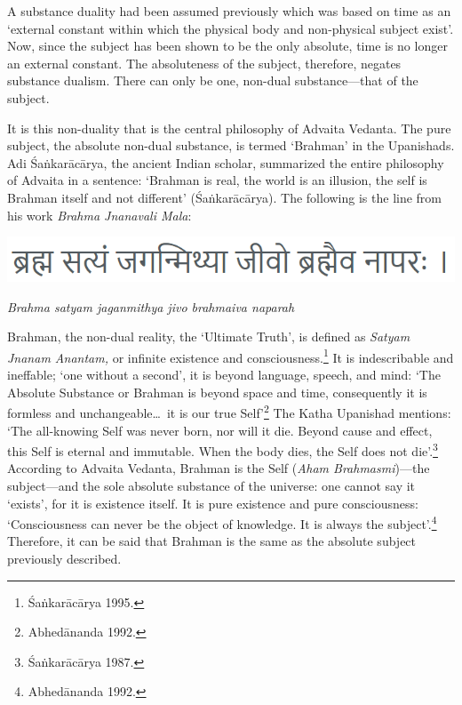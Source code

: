 A substance duality had been assumed previously which was based on time
as an `external constant within which the physical body and non-physical
subject exist'. Now, since the subject has been shown to be the only
absolute, time is no longer an external constant. The absoluteness of
the subject, therefore, negates substance dualism. There can only be
one, non-dual substance---that of the subject.

It is this non-duality that is the central philosophy of Advaita
Vedanta. The pure subject, the absolute non-dual substance, is termed
`Brahman' in the Upanishads. Adi \'Sa\.nkar\=ac\=arya, the ancient Indian
scholar, summarized the entire philosophy of Advaita in a sentence:
`Brahman is real, the world is an illusion, the self is Brahman itself
and not different' (\'Sa\.nkar\=ac\=arya). The following is the line from his
work \emph{Brahma Jnanavali Mala}:
\begin{center}
\includegraphics[scale = 0.525]{nathBrahma}

\emph{Brahma satyam jaganmithya jivo brahmaiva naparah}
\end{center}
Brahman, the non-dual reality, the `Ultimate Truth', is defined as
\emph{Satyam Jnanam Anantam,} or infinite existence and consciousness.\footnote{\'Sa\.nkar\=ac\=arya 1995.} It is indescribable and ineffable; `one without a
second', it is beyond language, speech, and mind: `The Absolute
Substance or Brahman is beyond space and time, consequently it is
formless and unchangeable\ldots\ it is our true Self'\footnote{Abhed\=ananda
1992.} The Katha Upanishad mentions: `The all-knowing Self was never
born, nor will it die. Beyond cause and effect, this Self is eternal and
immutable. When the body dies, the Self does not die'.\footnote{\'Sa\.nkar\=ac\=arya
1987.} According to Advaita Vedanta, Brahman is the Self (\emph{Aham
Brahmasmi})---the subject---and the sole absolute substance of the
universe: one cannot say it `exists', for it is existence itself. It is
pure existence and pure consciousness: `Consciousness can never be the
object of knowledge. It is always the subject'.\footnote{Abhed\=ananda 1992.}
Therefore, it can be said that Brahman is the same as the absolute
subject previously described.

